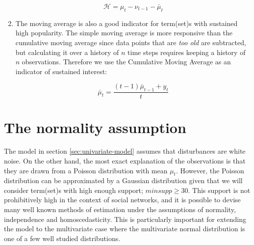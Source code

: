 \documentclass[11pt]{llncs} %
\begin{document}
\begin{enumerate}
\begin{center}
\begin{equation}
\mathcal{H} = \mu_t - \nu_{t-1} - \bar{\mu}_{t}
\end{equation}
\end{center}
\item The moving average is also a good indicator for term(set)s with sustained high popularity. The simple moving average is more responsive than the cumulative moving average since data points that are \emph{too old} are subtracted, but calculating it over a history of $n$ time steps requires keeping a history of $n$ observations. Therefore we use the Cumulative Moving Average as an indicator of sustained interest:
\begin{center}
\begin{equation}
\bar{\mu}_{t} =  \frac{(t-1) \bar{\mu}_{t-1} + y_{t}}{t}
\end{equation}
\end{center}
\end{enumerate}

\section{The normality assumption}
The model in section \ref{sec:univariate-model} assumes that disturbances are white noise. On the other hand, the most exact explanation of the observations is that they are drawn from a Poisson distribution with mean $\mu_t$. However, the Poisson distribution can be approximated by a Gaussian distribution given that we will consider term(set)s with high enough support; $minsupp \ge 30$. This support is not prohibitively high in the context of social networks, and it is possible to devise many well known methods of estimation under the assumptions of normality, independence and homoscedasticity. This is particularly important for extending the model to the multivariate case where the multivariate normal distribution is one of a few well studied distributions.
\end{document}
